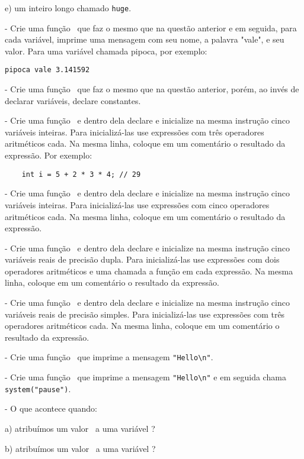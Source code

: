 	e) um inteiro longo chamado {\tt huge}.

\NEWLINE
\quest - Crie uma função \MAIN\ que faz o mesmo que na questão anterior e em seguida, para cada variável, imprime uma mensagem com seu nome, a palavra "vale", e seu valor. Para uma variável chamada pipoca, por exemplo:

	{\tt pipoca vale 3.141592}

\NEWLINE
\quest - Crie uma função \MAIN\ que faz o mesmo que na questão anterior, porém, ao invés de declarar variáveis, declare constantes.

\NEWLINE
\quest - Crie uma função \MAIN\ e dentro dela declare e inicialize na mesma instrução cinco variáveis inteiras. Para inicializá-las use expressões com três operadores aritméticos cada. Na mesma linha, coloque em um comentário o resultado da expressão. Por exemplo:
\begin{lstlisting}
	int i = 5 + 2 * 3 * 4; // 29
\end{lstlisting}

\NEWLINE
\quest - Crie uma função \MAIN\ e dentro dela declare e inicialize na mesma instrução cinco variáveis inteiras. Para inicializá-las use expressões com cinco operadores aritméticos cada. Na mesma linha, coloque em um comentário o resultado da expressão.

\NEWLINE
\quest - Crie uma função \MAIN\ e dentro dela declare e inicialize na mesma instrução cinco variáveis reais de precisão dupla. Para inicializá-las use expressões com dois operadores aritméticos e uma chamada a função em cada expressão. Na mesma linha, coloque em um comentário o resultado da expressão.

\NEWLINE
\quest - Crie uma função \MAIN\ e dentro dela declare e inicialize na mesma instrução cinco variáveis reais de precisão simples. Para inicializá-las use expressões com três operadores aritméticos cada. Na mesma linha, coloque em um comentário o resultado da expressão.

\NEWLINE
\quest - Crie uma função \MAIN\ que imprime a mensagem \verb|"Hello\n"|.

\NEWLINE
\quest - Crie uma função \MAIN\ que imprime a mensagem \verb|"Hello\n"| e em seguida chama \verb|system("pause")|.

\NEWLINE
\quest - O que acontece quando:

	a) atribuímos um valor \INT\ a uma variável \FLOAT?

	b) atribuímos um valor \FLOAT\ a uma variável \INT?


